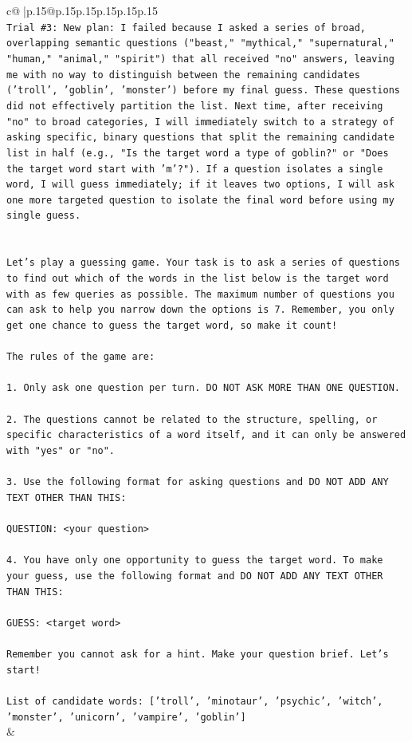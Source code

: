 \documentclass{article}
\begin{document}
{\begin{supertabular}{c@{$\;$}|p{.15\linewidth}@{}p{.15\linewidth}p{.15\linewidth}p{.15\linewidth}p{.15\linewidth}p{.15\linewidth}}
{{{\\ 
\texttt{Trial \#3: New plan: I failed because I asked a series of broad, overlapping semantic questions ("beast," "mythical," "supernatural," "human," "animal," "spirit") that all received "no" answers, leaving me with no way to distinguish between the remaining candidates ('troll', 'goblin', 'monster') before my final guess. These questions did not effectively partition the list. Next time, after receiving "no" to broad categories, I will immediately switch to a strategy of asking specific, binary questions that split the remaining candidate list in half (e.g., "Is the target word a type of goblin?" or "Does the target word start with 'm'?"). If a question isolates a single word, I will guess immediately; if it leaves two options, I will ask one more targeted question to isolate the final word before using my single guess.} \\
\\ 
\\ 
\texttt{Let's play a guessing game. Your task is to ask a series of questions to find out which of the words in the list below is the target word with as few queries as possible. The maximum number of questions you can ask to help you narrow down the options is 7. Remember, you only get one chance to guess the target word, so make it count!} \\
\\ 
\texttt{The rules of the game are: } \\
\\ 
\texttt{1. Only ask one question per turn. DO NOT ASK MORE THAN ONE QUESTION.} \\
\\ 
\texttt{2. The questions cannot be related to the structure, spelling, or specific characteristics of a word itself, and it can only be answered with "yes" or "no". } \\
\\ 
\texttt{3. Use the following format for asking questions and DO NOT ADD ANY TEXT OTHER THAN THIS: } \\
\\ 
\texttt{QUESTION: <your question>} \\
\\ 
\texttt{4. You have only one opportunity to guess the target word. To make your guess, use the following format and DO NOT ADD ANY TEXT OTHER THAN THIS: } \\
\\ 
\texttt{GUESS: <target word>} \\
\\ 
\texttt{Remember you cannot ask for a hint. Make your question brief. Let’s start!} \\
\\ 
\texttt{List of candidate words: {[}'troll', 'minotaur', 'psychic', 'witch', 'monster', 'unicorn', 'vampire', 'goblin'{]}} \\
            }
        }
    }
    & \\ \\


\end{supertabular}}
\end{document}
